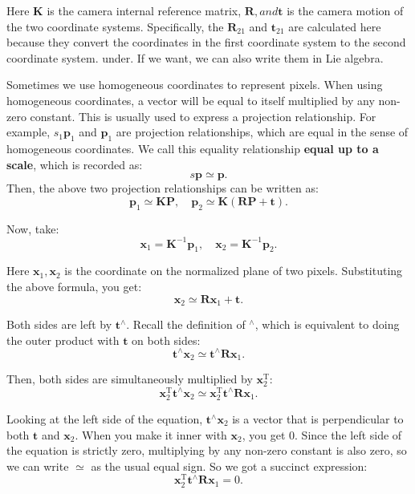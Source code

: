 Here $\bm{K}$ is the camera internal reference matrix, $\bm{R}, and \bm{t}$ is the camera motion of the two coordinate systems. Specifically, the $\bm{R}_{21}$ and $\bm{t}_{21}$ are calculated here because they convert the coordinates in the first coordinate system to the second coordinate system. under. If we want, we can also write them in Lie algebra.

Sometimes we use homogeneous coordinates to represent pixels. When using homogeneous coordinates, a vector will be equal to itself multiplied by any non-zero constant. This is usually used to express a projection relationship. For example, $s_1 \bm{p}_1$ and $\bm{p}_1$ are projection relationships, which are equal in the sense of homogeneous coordinates. We call this equality relationship \textbf{equal up to a scale}, which is recorded as:
\begin{equation}
s\bm{p} \simeq \bm{p}.
\end{equation}
Then, the above two projection relationships can be written as:
\begin{equation}
 {\bm{p}_1} \simeq \bm{KP},\quad \bm{p}_2 \simeq \bm{K}\left( \bm{RP + t} \right).
\end{equation}

Now, take:
\begin{equation}
{\bm{x}_1} = {\bm{K}^{ - 1}}{\bm{p}_1}, \quad {\bm{x}_2} = {\bm{K}^{ - 1}}{\bm{p}_2}.
\end{equation}

Here $\bm{x}_1, \bm{x}_2$ is the coordinate on the normalized plane of two pixels. Substituting the above formula, you get:
\begin{equation}
{\bm{x}_2} \simeq \bm{R} {\bm{x}_1} + \bm{t}.
\end{equation}

Both sides are left by $\bm{t}^\wedge$. Recall the definition of $^\wedge$, which is equivalent to doing the outer product with $\bm{t}$ on both sides:
\begin{equation}
\bm{t}^\wedge \bm{x}_2 \simeq \bm{t}^\wedge \bm{R} \bm{x}_1.
\end{equation}

Then, both sides are simultaneously multiplied by $\bm{x}_2^\mathrm{T}$:
\begin{equation}
\bm{x}_2^\mathrm{T} \bm{t}^\wedge \bm{x}_2 \simeq \bm{x}_2^\mathrm{T} \bm{t}^\wedge \bm {R} \bm{x}_1.
\end{equation}

Looking at the left side of the equation, $\bm{t}^\wedge \bm{x}_2$ is a vector that is perpendicular to both $\bm{t}$ and $\bm{x}_2$. When you make it inner with $\bm{x}_2$, you get 0. Since the left side of the equation is strictly zero, multiplying by any non-zero constant is also zero, so we can write $\simeq$ as the usual equal sign. So we got a succinct expression:
\begin{equation}
 \bm{x}_2^\mathrm{T} \bm{t}^\wedge \bm{R} \bm{x}_1 = 0.
\end{equation}

